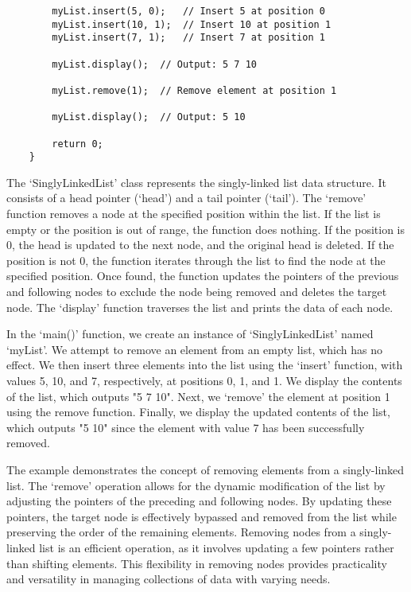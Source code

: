\begin{solution}
\begin{verbatim}
        myList.insert(5, 0);   // Insert 5 at position 0
        myList.insert(10, 1);  // Insert 10 at position 1
        myList.insert(7, 1);   // Insert 7 at position 1
    
        myList.display();  // Output: 5 7 10
    
        myList.remove(1);  // Remove element at position 1
    
        myList.display();  // Output: 5 10
    
        return 0;
    }        
    \end{verbatim}

    \horizontalline

    The `SinglyLinkedList' class represents the singly-linked list data structure. It consists of a head pointer (`head') and a tail pointer (`tail'). The `remove' function removes a node at the specified position within the list. If the list is empty or the position 
    is out of range, the function does nothing. If the position is 0, the head is updated to the next node, and the original head is deleted. If the position is not 0, the function iterates through the list to find the node at the specified position. Once found, the 
    function updates the pointers of the previous and following nodes to exclude the node being removed and deletes the target node. The `display' function traverses the list and prints the data of each node.

    In the `main()' function, we create an instance of `SinglyLinkedList' named `myList'. We attempt to remove an element from an empty list, which has no effect. We then insert three elements into the list using the `insert' function, with values 5, 10, and 7, respectively, 
    at positions 0, 1, and 1. We display the contents of the list, which outputs "5 7 10". Next, we `remove' the element at position 1 using the remove function. Finally, we display the updated contents of the list, which outputs "5 10" since the element with value 7 has 
    been successfully removed.

    The example demonstrates the concept of removing elements from a singly-linked list. The `remove' operation allows for the dynamic modification of the list by adjusting the pointers of the preceding and following nodes. By updating these pointers, the target node is 
    effectively bypassed and removed from the list while preserving the order of the remaining elements. Removing nodes from a singly-linked list is an efficient operation, as it involves updating a few pointers rather than shifting elements. This flexibility in removing nodes 
    provides practicality and versatility in managing collections of data with varying needs.
\end{solution}

